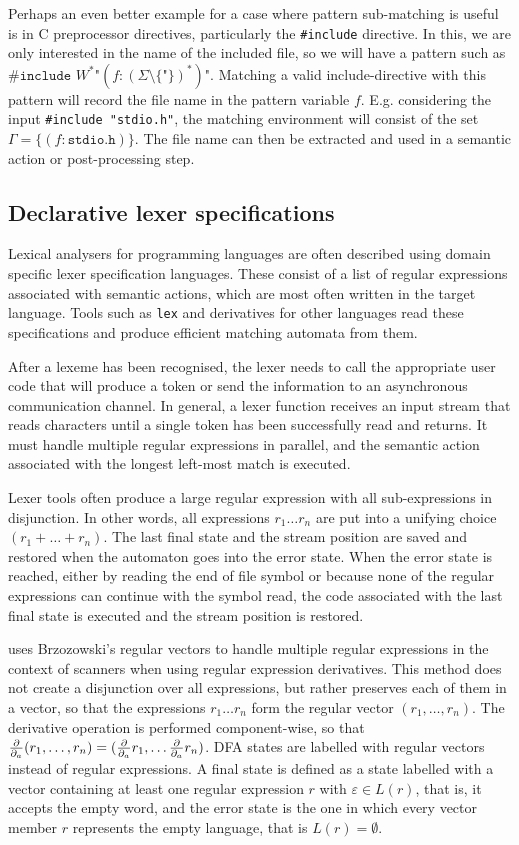 Perhaps an even better example for a case where pattern sub-matching is useful
is in C preprocessor directives, particularly the \verb!#include! directive. In
this, we are only interested in the name of the included file, so we will have a
pattern such as $\texttt{\#include } W^* \texttt{"} (f:(\Sigma \setminus
\{\texttt{"}\})^*) \texttt{"}$. Matching a valid include-directive with this
pattern will record the file name in the pattern variable $f$. E.g. considering
the input \verb!#include "stdio.h"!, the matching environment will consist of
the set $\Gamma = \{ (f:\texttt{stdio.h}) \}$. The file name can then be
extracted and used in a semantic action or post-processing step.

\subsection{Declarative lexer specifications}

Lexical analysers for programming languages are often described using domain
specific lexer specification languages. These consist of a list of regular
expressions associated with semantic actions, which are most often written in
the target language. Tools such as \texttt{lex} and derivatives for other
languages read these specifications and produce efficient matching automata from
them.

After a lexeme has been recognised, the lexer needs to call the appropriate user
code that will produce a token or send the information to an asynchronous
communication channel. In general, a lexer function receives an input stream
that reads characters until a single token has been successfully read and
returns. It must handle multiple regular expressions in parallel, and the
semantic action associated with the longest left-most match is executed.

Lexer tools often produce a large regular expression with all sub-expressions in
disjunction. In other words, all expressions $r_1 \dots r_n$ are put into a
unifying choice $(r_1 + \dots + r_n)$. The last final state and the stream
position are saved and restored when the automaton goes into the error state.
When the error state is reached, either by reading the end of file symbol or
because none of the regular expressions can continue with the symbol read, the
code associated with the last final state is executed and the stream position is
restored.

\cite{re-deriv} uses Brzozowski's regular vectors to handle multiple regular
expressions in the context of scanners when using regular expression
derivatives. This method does not create a disjunction over all expressions, but
rather preserves each of them in a vector, so that the expressions $r_1 \dots
r_n$ form the regular vector $(r_1, \dots, r_n)$. The derivative operation is
performed component-wise, so that $\frac{\partial}{\partial_{a}}(r_1, \dots, r_n) = (\frac{\partial}{\partial_{a}} r_1, \dots \frac{\partial}{\partial_{a}}
r_n)$. DFA states are labelled with regular vectors instead of regular
expressions. A final state is defined as a state labelled with a vector
containing at least one regular expression $r$ with $\varepsilon \in L(r)$, that
is, it accepts the empty word, and the error state is the one in which every
vector member $r$ represents the empty language, that is $L(r) = \emptyset$.

